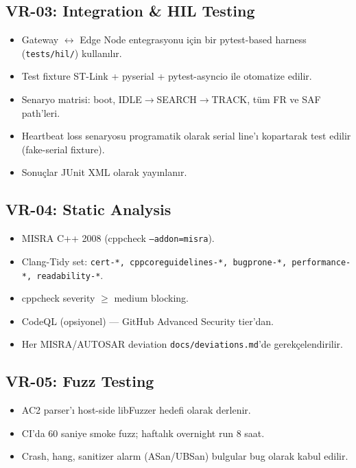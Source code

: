 \subsection{VR-03: Integration \& HIL Testing}
\begin{itemize}
    \item Gateway $\leftrightarrow$ Edge Node entegrasyonu için bir pytest-based harness (\texttt{tests/hil/}) kullanılır.
    \item Test fixture ST-Link + pyserial + pytest-asyncio ile otomatize edilir.
    \item Senaryo matrisi: boot, IDLE$\rightarrow$SEARCH$\rightarrow$TRACK, tüm FR ve SAF path'leri.
    \item Heartbeat loss senaryosu programatik olarak serial line'ı kopartarak test edilir (fake-serial fixture).
    \item Sonuçlar JUnit XML olarak yayınlanır.
\end{itemize}

\subsection{VR-04: Static Analysis}
\begin{itemize}
    \item MISRA C++ 2008 (cppcheck \texttt{--addon=misra}).
    \item Clang-Tidy set: \texttt{cert-*, cppcoreguidelines-*, bugprone-*, performance-*, readability-*}.
    \item cppcheck severity $\geq$ medium blocking.
    \item CodeQL (opsiyonel) — GitHub Advanced Security tier'dan.
    \item Her MISRA/AUTOSAR deviation \texttt{docs/deviations.md}'de gerekçelendirilir.
\end{itemize}

\subsection{VR-05: Fuzz Testing}
\begin{itemize}
    \item AC2 parser'ı host-side libFuzzer hedefi olarak derlenir.
    \item CI'da 60 saniye smoke fuzz; haftalık overnight run 8 saat.
    \item Crash, hang, sanitizer alarm (ASan/UBSan) bulgular bug olarak kabul edilir.
\end{itemize}

